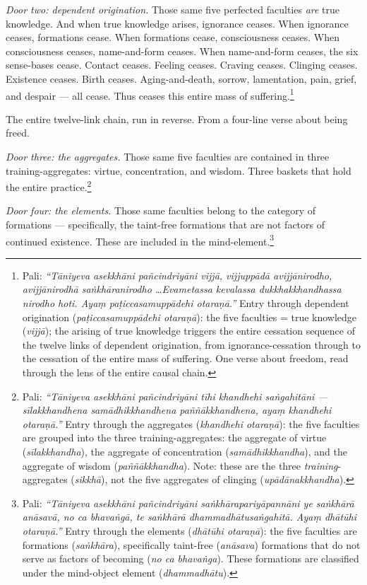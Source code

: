 \textit{Door two: dependent origination.} Those same five perfected faculties \textit{are} true knowledge. And when true knowledge arises, ignorance ceases. When ignorance ceases, formations cease. When formations cease, consciousness ceases. When consciousness ceases, name-and-form ceases. When name-and-form ceases, the six sense-bases cease. Contact ceases. Feeling ceases. Craving ceases. Clinging ceases. Existence ceases. Birth ceases. Aging-and-death, sorrow, lamentation, pain, grief, and despair --- all cease. Thus ceases this entire mass of suffering.\footnote{Pali: \textit{``Tāniyeva asekkhāni pañcindriyāni vijjā, vijjuppādā avijjānirodho, avijjānirodhā saṅkhāranirodho \ldots Evametassa kevalassa dukkhakkhandhassa nirodho hoti. Ayaṃ paṭiccasamuppādehi otaraṇā.''} Entry through dependent origination (\textit{paṭiccasamuppādehi otaraṇā}): the five faculties = true knowledge (\textit{vijjā}); the arising of true knowledge triggers the entire cessation sequence of the twelve links of dependent origination, from ignorance-cessation through to the cessation of the entire mass of suffering. One verse about freedom, read through the lens of the entire causal chain.}

The entire twelve-link chain, run in reverse. From a four-line verse about being freed.

\textit{Door three: the aggregates.} Those same five faculties are contained in three training-aggregates: virtue, concentration, and wisdom. Three baskets that hold the entire practice.\footnote{Pali: \textit{``Tāniyeva asekkhāni pañcindriyāni tīhi khandhehi saṅgahitāni --- sīlakkhandhena samādhikkhandhena paññākkhandhena, ayaṃ khandhehi otaraṇā.''} Entry through the aggregates (\textit{khandhehi otaraṇā}): the five faculties are grouped into the three training-aggregates: the aggregate of virtue (\textit{sīlakkhandha}), the aggregate of concentration (\textit{samādhikkhandha}), and the aggregate of wisdom (\textit{paññākkhandha}). Note: these are the three \textit{training}-aggregates (\textit{sikkhā}), not the five aggregates of clinging (\textit{upādānakkhandha}).}

\textit{Door four: the elements.} Those same faculties belong to the category of formations --- specifically, the taint-free formations that are not factors of continued existence. These are included in the mind-element.\footnote{Pali: \textit{``Tāniyeva asekkhāni pañcindriyāni saṅkhārapariyāpannāni ye saṅkhārā anāsavā, no ca bhavaṅgā, te saṅkhārā dhammadhātusaṅgahitā. Ayaṃ dhātūhi otaraṇā.''} Entry through the elements (\textit{dhātūhi otaraṇā}): the five faculties are formations (\textit{saṅkhāra}), specifically taint-free (\textit{anāsava}) formations that do not serve as factors of becoming (\textit{no ca bhavaṅga}). These formations are classified under the mind-object element (\textit{dhammadhātu}).}

